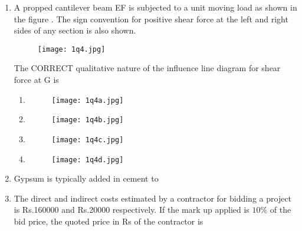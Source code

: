 \documentclass[journal,12pt,onecolumn]{article}
\theoremstyle{remark}
\begin{document}
\begin{enumerate}
\item A propped cantilever beam EF is subjected to a unit moving load as shown in the figure . The sign convention for positive shear force at the left and right sides of any section is also shown.
\begin{figure}[H]
    \centering
    \texttt{[image: 1q4.jpg]}
    \caption{}
    \label{fig:q4}
\end{figure}
The CORRECT qualitative nature of the influence line diagram for shear force at G is

\hfill{}
\begin{enumerate}
  \item \begin{figure}[H]
    \centering
    \texttt{[image: 1q4a.jpg]}
    \caption{}
    \label{fig:q4}
\end{figure}
  \item \begin{figure}[H]
    \centering
    \texttt{[image: 1q4b.jpg]}
    \caption{}
    \label{fig:q4}
\end{figure}
  \item \begin{figure}[H]
    \centering
    \texttt{[image: 1q4c.jpg]}
    \caption{}
    \label{fig:q4}
\end{figure}
  \item \begin{figure}[H]
    \centering
    \texttt{[image: 1q4d.jpg]}
    \caption{}
    \label{fig:q4}
\end{figure}
\end{enumerate}

\item Gypsum is typically added in cement to

\hfill{}
\begin{enumerate}
\end{enumerate}

\item The direct and indirect costs estimated by a contractor for bidding a project is Rs.160000 and Rs.20000 respectively. If the mark up applied is $10\%$ of the bid price, the quoted price in Rs of the contractor is


\end{enumerate}
\end{document}
